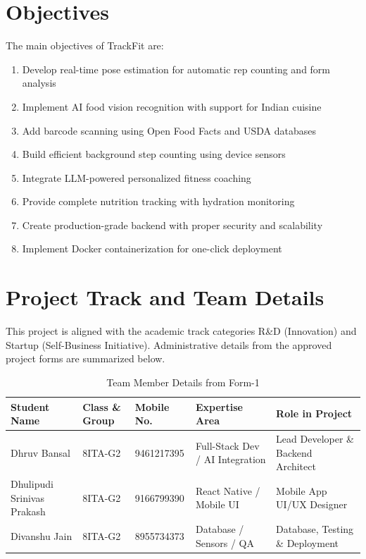 \documentclass[12pt]{report}
\begin{document}
\section{Objectives}
The main objectives of TrackFit are:
\begin{enumerate}
    \item Develop real-time pose estimation for automatic rep counting and form analysis
    \item Implement AI food vision recognition with support for Indian cuisine
    \item Add barcode scanning using Open Food Facts and USDA databases
    \item Build efficient background step counting using device sensors
    \item Integrate LLM-powered personalized fitness coaching
    \item Provide complete nutrition tracking with hydration monitoring
    \item Create production-grade backend with proper security and scalability
    \item Implement Docker containerization for one-click deployment
\end{enumerate}

\section{Project Track and Team Details}
This project is aligned with the academic track categories R\&D (Innovation) and Startup (Self-Business Initiative). Administrative details from the approved project forms are summarized below.

\begin{table}[H]
\centering
\renewcommand{\arraystretch}{1.25}
\begin{tabular}{|p{3.4cm}|p{3.0cm}|p{2.7cm}|p{3.5cm}|p{3.6cm}|}
\hline
\textbf{Student Name} & \textbf{Class \& Group} & \textbf{Mobile No.} & \textbf{Expertise Area} & \textbf{Role in Project} \\ \hline
Dhruv Bansal & 8ITA-G2 & 9461217395 & Full-Stack Dev / AI Integration & Lead Developer \& Backend Architect \\ \hline
Dhulipudi Srinivas Prakash & 8ITA-G2 & 9166799390 & React Native / Mobile UI & Mobile App UI/UX Designer \\ \hline
Divanshu Jain & 8ITA-G2 & 8955734373 & Database / Sensors / QA & Database, Testing \& Deployment \\ \hline
\end{tabular}
\caption{Team Member Details from Form-1}
\end{table}
\end{document}
